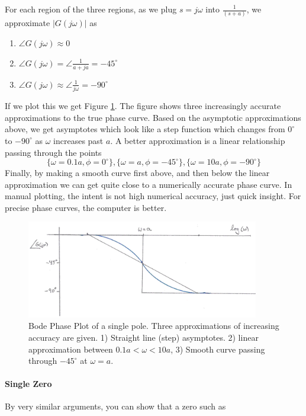 For each region of the three regions, 
as we plug  $s=j\omega$ into $ \frac{1}{(s+a)}$, we   approximate $|G(j\omega)|$ as

\begin{enumerate}
  \item  $\angle G(j\omega)   \approx 0$
  \item  $\angle G(j\omega) = \angle \frac{1}{a+ja}   =  -45^\circ $
  \item  $\angle G(j\omega) \approx \angle  \frac{1}{j\omega}  = -90^\circ$
\end{enumerate}


If we plot this we get Figure \ref{BodePhaseOnePole}. The figure shows three increasingly accurate approximations to the true phase curve.  Based on the asymptotic approximations above, we get asymptotes which look like a step function which changes from $0^\circ$ to $-90^\circ$ as $\omega$ increases past $a$.
A better approximation is a linear relationship passing through the points
\[
\{\omega=0.1a, \phi = 0^\circ\}, \{\omega=a, \phi = -45^\circ\}, \{\omega=10a, \phi=-90^\circ\}
\]
Finally, by making a smooth curve first above, and then below the linear approximation we can get quite close to a numerically accurate phase curve.  In manual plotting, the intent is not high numerical accuracy, just quick insight.   For precise phase curves, the computer is better.

\begin{figure}\centering
\includegraphics[width=4.0in]{figs05/00757a.png}
\caption{Bode Phase Plot of a single pole. Three approximations of increasing accuracy are given.  1) Straight line (step) asymptotes.  2) linear approximation between $0.1a < \omega < 10a$, 3) Smooth curve passing through $-45^\circ$ at $\omega=a$.}\label{BodePhaseOnePole}
\end{figure}

\paragraph{Single Zero}
By very similar arguments, you can show that a zero such as

